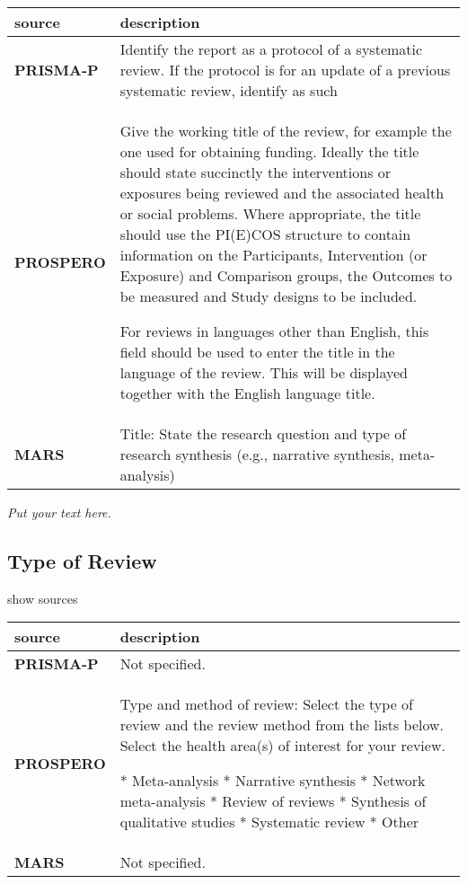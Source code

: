 \documentclass[]{article}
\begin{document}
\hypertarget{wt}{}
\begin{table}[H]
\centering
\begin{tabular}{>{\bfseries}l|l}
\hline
\rowcolor[HTML]{ececec}  source & description\\
\hline
PRISMA-P & Identify the report as a protocol of a systematic review. If the protocol is for an update of a previous systematic review, identify as such\\
\hline
PROSPERO & Give the working title of the review, for example the one used for obtaining funding. Ideally the title should state succinctly the interventions or exposures being reviewed and the associated health or social problems. Where appropriate, the title should use the PI(E)COS structure to contain information on the Participants, Intervention (or Exposure) and Comparison groups, the Outcomes to be measured and Study designs to be included.

For reviews in languages other than English, this field should be used to enter the title in the language of the
review. This will be displayed together with the English language title.\\
\hline
MARS & Title: State the research question and type of research synthesis (e.g., narrative synthesis, meta-analysis)\\
\hline
\end{tabular}
\end{table}

\emph{Put your text here.}

\hypertarget{type-of-review}{%
\subsection{Type of Review}\label{type-of-review}}

show sources

\hypertarget{typeor}{}
\begin{table}[H]
\centering
\begin{tabular}{>{\bfseries}l|l}
\hline
\rowcolor[HTML]{ececec}  source & description\\
\hline
PRISMA-P & Not specified.\\
\hline
PROSPERO & Type and method of review: Select the type of review and the review method from the lists below. Select the health area(s) of interest for your review.

* Meta-analysis
* Narrative synthesis
* Network meta-analysis
* Review of reviews
* Synthesis of qualitative studies
* Systematic review
* Other\\
\hline
MARS & Not specified.\\
\hline
\end{tabular}
\end{table}
\end{document}

